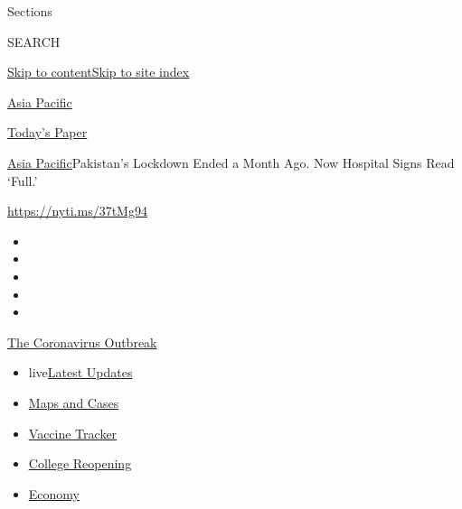 Sections

SEARCH

\protect\hyperlink{site-content}{Skip to
content}\protect\hyperlink{site-index}{Skip to site index}

\href{https://www.nytimes.com/section/world/asia}{Asia Pacific}

\href{https://myaccount.nytimes.com/auth/login?response_type=cookie\&client_id=vi}{}

\href{https://www.nytimes.com/section/todayspaper}{Today's Paper}

\href{/section/world/asia}{Asia Pacific}\textbar{}Pakistan's Lockdown
Ended a Month Ago. Now Hospital Signs Read `Full.'

\url{https://nyti.ms/37tMg94}

\begin{itemize}
\item
\item
\item
\item
\item
\end{itemize}

\href{https://www.nytimes.com/news-event/coronavirus?action=click\&pgtype=Article\&state=default\&region=TOP_BANNER\&context=storylines_menu}{The
Coronavirus Outbreak}

\begin{itemize}
\tightlist
\item
  live\href{https://www.nytimes.com/2020/08/04/world/coronavirus-cases.html?action=click\&pgtype=Article\&state=default\&region=TOP_BANNER\&context=storylines_menu}{Latest
  Updates}
\item
  \href{https://www.nytimes.com/interactive/2020/us/coronavirus-us-cases.html?action=click\&pgtype=Article\&state=default\&region=TOP_BANNER\&context=storylines_menu}{Maps
  and Cases}
\item
  \href{https://www.nytimes.com/interactive/2020/science/coronavirus-vaccine-tracker.html?action=click\&pgtype=Article\&state=default\&region=TOP_BANNER\&context=storylines_menu}{Vaccine
  Tracker}
\item
  \href{https://www.nytimes.com/2020/08/02/us/covid-college-reopening.html?action=click\&pgtype=Article\&state=default\&region=TOP_BANNER\&context=storylines_menu}{College
  Reopening}
\item
  \href{https://www.nytimes.com/live/2020/08/04/business/stock-market-today-coronavirus?action=click\&pgtype=Article\&state=default\&region=TOP_BANNER\&context=storylines_menu}{Economy}
\end{itemize}

